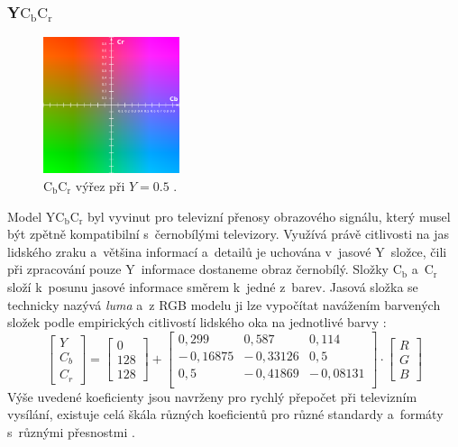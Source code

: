 \documentclass[11pt, a4paper, titlepage]{article}
\begin{document}
\subsubsection{Y$\text{C}_\text{b}\text{C}_\text{r}$}
\begin{figure}
    \centering
    \includegraphics[width=4cm]{YCBCR.png}
    \caption{$\text{C}_\text{b}\text{C}_\text{r}$ výřez při $Y=0.5$ \cite{wiki:YCbCr}.}\label{wrap-fig:1}
\end{figure}
Model Y$\text{C}_\text{b}\text{C}_\text{r}$ byl vyvinut pro televizní přenosy obrazového signálu, který musel být zpětně kompatibilní s~černobílými televizory.
Využívá právě citlivosti na jas lidského zraku a~většina informací a~detailů je uchována v~jasové Y~složce, čili při zpracování pouze Y~informace dostaneme obraz černobílý.
Složky $\text{C}_\text{b}$ a~$\text{C}_\text{r}$ složí k~posunu jasové informace směrem k~jedné z~barev.
Jasová složka se technicky nazývá \emph{luma} a~z RGB modelu ji lze vypočítat navážením
barvených složek podle empirických citlivostí lidského oka na jednotlivé barvy \cite{mul_opora}:
$$
\begin{bmatrix}Y\\C_b\\C_r\end{bmatrix}
=
\begin{bmatrix}0\\128\\128\end{bmatrix}
+
\begin{bmatrix}
    0,\!299 & 0,\!587 & 0,\!114 \\
    -\,0,\!16875 & -\,0,\!33126 & 0,\!5 \\
    0,\!5 & -\,0,\!41869 & -\,0,\!08131 \\
\end{bmatrix}
\cdot
\begin{bmatrix}R\\G\\B\end{bmatrix}
$$
Výše uvedené koeficienty jsou navrženy pro rychlý přepočet při televizním vysílání, existuje celá škála různých koeficientů pro různé standardy a~formáty s~různými přesnostmi \cite{wiki:YCbCr}.
\end{document}

